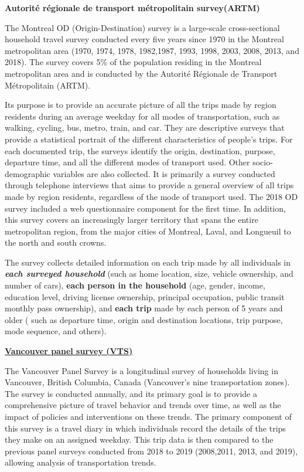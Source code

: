 \documentclass[12pt,twoside]{reedthesis}
\begin{document}
\textbf{Autorité régionale de transport métropolitain survey(ARTM)}

The Montreal OD (Origin-Destination) survey is a large-scale cross-sectional household travel survey conducted every five years since 1970 in the Montreal metropolitan area (1970, 1974, 1978, 1982,1987, 1993, 1998, 2003, 2008, 2013, and 2018). The survey covers 5\% of the population residing in the Montreal metropolitan area and is conducted by the Autorité Régionale de Transport Métropolitain (ARTM).

Its purpose is to provide an accurate picture of all the trips made by region residents during an average weekday for all modes of transportation, such as walking, cycling, bus, metro, train, and car. They are descriptive surveys that provide a statistical portrait of the different characteristics of people's trips. For each documented trip, the surveys identify the origin, destination, purpose, departure time, and all the different modes of transport used. Other socio-demographic variables are also collected. It is primarily a survey conducted through telephone interviews that aims to provide a general overview of all trips made by region residents, regardless of the mode of transport used. The 2018 OD survey included a web questionnaire component for the first time. In addition, this survey covers an increasingly larger territory that spans the entire metropolitan region, from the major cities of Montreal, Laval, and Longueuil to the north and south crowns.

The survey collects detailed information on each trip made by all individuals in \textbf{\emph{each surveyed household}} (such as home location, size, vehicle ownership, and number of cars), \textbf{each person in the household} (age, gender, income, education level, driving license ownership, principal occupation, public transit monthly pass ownership), and \textbf{each trip} made by each person of 5 years and older ( such as departure time, origin and destination locations, trip purpose, mode sequence, and others).

\textbf{\href{https://vancouver.ca/streets-transportation/annual-transportation-survey.aspx}{Vancouver panel survey (VTS)}}

The Vancouver Panel Survey is a longitudinal survey of households living in Vancouver, British Columbia, Canada (Vancouver's nine transportation zones). The survey is conducted annually, and its primary goal is to provide a comprehensive picture of travel behavior and trends over time, as well as the impact of policies and interventions on these trends. The primary component of this survey is a travel diary in which individuals record the details of the trips they make on an assigned weekday. This trip data is then compared to the previous panel surveys conducted from 2018 to 2019 (2008,2011, 2013, and 2019), allowing analysis of transportation trends.
\end{document}

